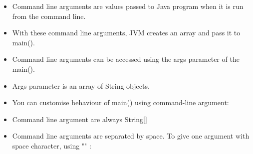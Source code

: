 

\begin{flushleft}
	
	\begin{itemize}
			\item Command line arguments are values passed to Java program when it is run from the command line. 
			\item With these command line arguments, JVM creates an array and pass it to main().
			\item Command line arguments can be accessed using the args parameter of the main(). 
			\item Args parameter is an array of String objects.
			\item You can customise behaviour of main() using command-line argument:
			
		
		
			\item Command line argument are always String[]
			
		
			\bigskip
			\item Command line arguments are separated by space. To give one argument with space character, using "" :
			
							
	\end{itemize}
	
	
\end{flushleft}
\newpage



